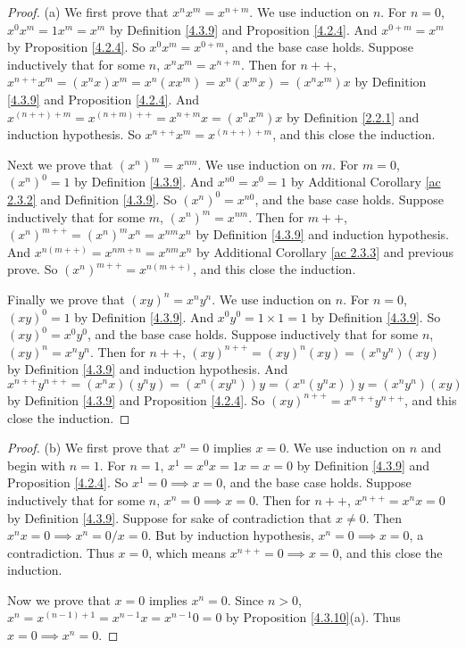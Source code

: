 \begin{proof}{(a)}
    We first prove that \(x^n x^m = x^{n + m}\).
    We use induction on \(n\).
    For \(n = 0\), \(x^0 x^m = 1 x^m = x^m\) by Definition \ref{4.3.9} and Proposition \ref{4.2.4}.
    And \(x^{0 + m} = x^m\) by Proposition \ref{4.2.4}.
    So \(x^0 x^m = x^{0 + m}\), and the base case holds.
    Suppose inductively that for some \(n\), \(x^n x^m = x^{n + m}\).
    Then for \(n++\), \(x^{n++} x^m = (x^n x) x^m = x^n (x x^m) = x^n (x^m x) = (x^n x^m)x\) by Definition \ref{4.3.9} and Proposition \ref{4.2.4}.
    And \(x^{(n++) + m} = x^{(n + m)++} = x^{n + m} x = (x^n x^m)x\) by Definition \ref{2.2.1} and induction hypothesis.
    So \(x^{n++} x^m = x^{(n++) + m}\), and this close the induction.

    Next we prove that \((x^n)^m = x^{nm}\).
    We use induction on \(m\).
    For \(m = 0\), \((x^n)^0 = 1\) by Definition \ref{4.3.9}.
    And \(x^{n0} = x^0 = 1\) by Additional Corollary \ref{ac 2.3.2} and Definition \ref{4.3.9}.
    So \((x^n)^0 = x^{n0}\), and the base case holds.
    Suppose inductively that for some \(m\), \((x^n)^m = x^{nm}\).
    Then for \(m++\), \((x^n)^{m++} = (x^n)^m x^n = x^{nm} x^n\) by Definition \ref{4.3.9} and induction hypothesis.
    And \(x^{n(m++)} = x^{nm + n} = x^{nm} x^n\) by Additional Corollary \ref{ac 2.3.3} and previous prove.
    So \((x^n)^{m++} = x^{n(m++)}\), and this close the induction.

    Finally we prove that \((xy)^n = x^n y^n\).
    We use induction on \(n\).
    For \(n = 0\), \((xy)^0 = 1\) by Definition \ref{4.3.9}.
    And \(x^0 y^0 = 1 \times 1 = 1\) by Definition \ref{4.3.9}.
    So \((xy)^0 = x^0 y^0\), and the base case holds.
    Suppose inductively that for some \(n\), \((xy)^n = x^n y^n\).
    Then for \(n++\), \((xy)^{n++} = (xy)^n (xy) = (x^n y^n)(xy)\) by Definition \ref{4.3.9} and induction hypothesis.
    And \(x^{n++} y^{n++} = (x^n x)(y^n y) = (x^n (x y^n))y = (x^n (y^n x))y = (x^n y^n)(xy)\) by Definition \ref{4.3.9} and Proposition \ref{4.2.4}.
    So \((xy)^{n++} = x^{n++} y^{n++}\), and this close the induction.
\end{proof}

\begin{proof}{(b)}
    We first prove that \(x^n = 0\) implies \(x = 0\).
    We use induction on \(n\) and begin with \(n = 1\).
    For \(n = 1\), \(x^1 = x^0 x = 1x = x = 0\) by Definition \ref{4.3.9} and Proposition \ref{4.2.4}.
    So \(x^1 = 0 \implies x = 0\), and the base case holds.
    Suppose inductively that for some \(n\), \(x^n = 0 \implies x = 0\).
    Then for \(n++\), \(x^{n++} = x^n x = 0\) by Definition \ref{4.3.9}.
    Suppose for sake of contradiction that \(x \neq 0\).
    Then \(x^n x = 0 \implies x^n = 0 / x = 0\).
    But by induction hypothesis, \(x^n = 0 \implies x = 0\), a contradiction.
    Thus \(x = 0\), which means \(x^{n++} = 0 \implies x = 0\), and this close the induction.

    Now we prove that \(x = 0\) implies \(x^n = 0\).
    Since \(n > 0\), \(x^n = x^{(n - 1) + 1} = x^{n - 1} x = x^{n - 1} 0 = 0\) by Proposition \ref{4.3.10}(a).
    Thus \(x = 0 \implies x^n = 0\).
\end{proof}

